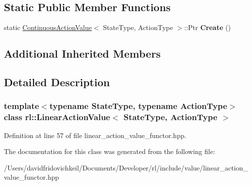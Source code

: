 \subsection*{Static Public Member Functions}
\begin{DoxyCompactItemize}
\item 
\hypertarget{classrl_1_1_linear_action_value_ad4562f9b8cf073e41532e4f7d771e94e}{}\label{classrl_1_1_linear_action_value_ad4562f9b8cf073e41532e4f7d771e94e} 
static \hyperlink{classrl_1_1_continuous_action_value}{Continuous\+Action\+Value}$<$ State\+Type, Action\+Type $>$\+::Ptr {\bfseries Create} ()
\end{DoxyCompactItemize}
\subsection*{Additional Inherited Members}


\subsection{Detailed Description}
\subsubsection*{template$<$typename State\+Type, typename Action\+Type$>$\newline
class rl\+::\+Linear\+Action\+Value$<$ State\+Type, Action\+Type $>$}



Definition at line 57 of file linear\+\_\+action\+\_\+value\+\_\+functor.\+hpp.



The documentation for this class was generated from the following file\+:\begin{DoxyCompactItemize}
\item 
/\+Users/davidfridovichkeil/\+Documents/\+Developer/rl/include/value/linear\+\_\+action\+\_\+value\+\_\+functor.\+hpp\end{DoxyCompactItemize}
